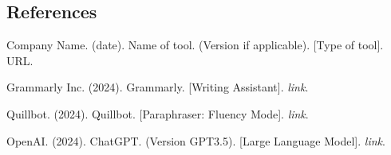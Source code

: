 \documentclass[a4paper]{article}
\begin{document}
\subsection{References}

Company Name. (date). Name of tool.  (Version if applicable). [Type of tool]. URL.

Grammarly Inc. (2024). Grammarly. [Writing Assistant]. \textit{link}.

Quillbot. (2024). Quillbot. [Paraphraser: Fluency Mode]. \textit{link}.

OpenAI. (2024). ChatGPT. (Version GPT3.5). [Large Language Model]. \textit{link}.
\end{document}
